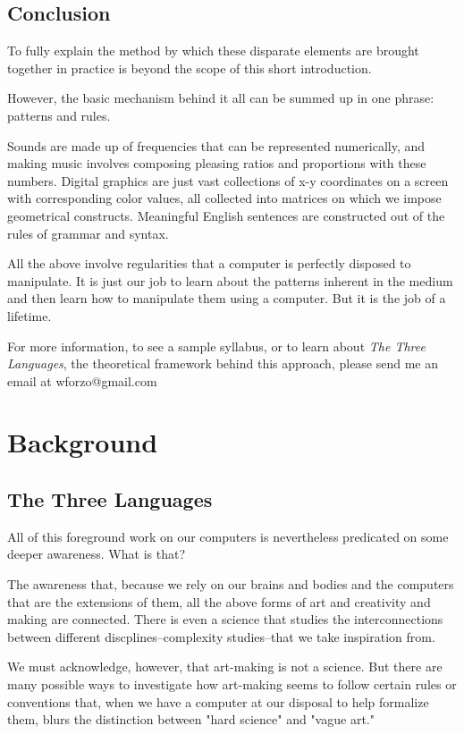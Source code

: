 \documentclass[11pt]{article}
\begin{document}
\subsection{Conclusion}
\label{sec:orgheadline9}
To fully explain the method by which these disparate elements are
brought together in practice is beyond the scope of this short
introduction. 

However, the basic mechanism behind it all can be summed up in one
phrase: patterns and rules.

Sounds are made up of frequencies that can be represented numerically,
and making music involves composing pleasing ratios and proportions
with these numbers. Digital graphics are just vast collections of x-y
coordinates on a screen with corresponding color values, all collected
into matrices on which we impose geometrical constructs. Meaningful
English sentences are constructed out of the rules of grammar and syntax.

All the above involve regularities that a computer is perfectly
disposed to manipulate. It is just our job to learn about the patterns
inherent in the medium and then learn how to manipulate them using a
computer. But it is the job of a lifetime.

For more information, to see a sample syllabus, or to learn about \emph{The
Three Languages}, the theoretical framework behind this approach, please
send me an email at wforzo@gmail.com

\section{Background}
\label{sec:orgheadline15}
\subsection{The Three Languages}
\label{sec:orgheadline11}
All of this foreground work on our computers is nevertheless
predicated on some deeper awareness. What is that? 

The awareness that, because we rely on our brains and bodies and the
computers that are the extensions of them, all the above forms of art
and creativity and making are connected. There is even a science that
studies the interconnections between different discplines--complexity
studies--that we take inspiration from.

We must acknowledge, however, that art-making is not a science. But
there are many possible ways to investigate how art-making seems to
follow certain rules or conventions that, when we have a computer at
our disposal to help formalize them, blurs the distinction between
"hard science" and "vague art."
\end{document}
